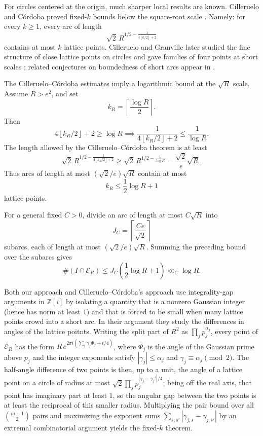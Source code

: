 \documentclass[11pt]{article}
\newcommand{\GI}{\mathbb Z[i]}
\newcommand{\floor}[1]{\left\lfloor #1 \right\rfloor}
\newcommand{\ceil}[1]{\left\lceil #1 \right\rceil}
\newcommand{\E}{\mathcal E}
\begin{document}
For circles centered at the origin, much sharper local results are known.
Cilleruelo and C\'ordoba proved fixed-\(k\) bounds below the square-root scale \cite{CillerueloCordoba1992}.
Namely: for every \(k\ge 1\), every arc of length
\[
  \sqrt2\,R^{1/2-\frac{1}{4\floor{k/2}+2}}
\]
contains at most \(k\) lattice points.
Cilleruelo and Granville later studied the fine structure of close lattice points on circles and gave families of four points at short scales \cite{CillerueloGranville2009}; related conjectures on boundedness of short arcs appear in \cite{CillerueloGranville2007}.

The Cilleruelo--C\'ordoba estimates imply a logarithmic bound at the \(\sqrt R\) scale.
Assume \(R>e^2\), and set
\[
  k_R=\ceil{\frac{\log R}{2}}.
\]
Then
\[
  4\floor{k_R/2}+2\ge \log R
  \implies
  \frac{1}{4\floor{k_R/2}+2}\le \frac1{\log R}.
\]
The length allowed by the Cilleruelo--C\'ordoba theorem is at least
\[
  \sqrt2\,R^{1/2-\frac{1}{4\floor{k_R/2}+2}}
  \ge
  \sqrt2\,R^{1/2-\frac1{\log R}}
  =
  \frac{\sqrt2}{e}\sqrt R.
\]
Thus arcs of length at most \((\sqrt2/e)\sqrt R\) contain at most
\[
  k_R\le \frac12\log R+1
\]
lattice points.

For a general fixed \(C>0\), divide an arc of length at most \(C\sqrt R\) into
\[
  J_C=\ceil{\frac{Ce}{\sqrt2}}
\]
subarcs, each of length at most \((\sqrt2/e)\sqrt R\).
Summing the preceding bound over the subarcs gives
\[
  \#(I\cap\E_R)
  \le
  J_C\left(\frac12\log R+1\right)
  \ll_C
  \log R.
\]

Both our approach and Cilleruelo--C\'ordoba's approach use integrality-gap arguments in \(\GI\) by isolating a quantity that is a nonzero Gaussian integer (hence has norm at least \(1\)) and that is forced to be small when many lattice points crowd into a short arc.
In their argument \cite{CillerueloCordoba1992} they study the differences in angles of the lattice poitnts.
Writing the split part of \(R^2\) as \(\prod_j p_j^{\alpha_j}\), every point of \(\E_R\) has the form \(R\,e^{2\pi i(\sum_j\gamma_j\Phi_j+t/4)}\), where \(\Phi_j\) is the angle of the Gaussian prime above \(p_j\) and the integer exponents satisfy \(|\gamma_j|\le\alpha_j\) and \(\gamma_j\equiv\alpha_j\pmod2\).
The half-angle difference of two points is then, up to a unit, the angle of a lattice point on a circle of radius at most \(\sqrt2\prod_j p_j^{|\gamma_j-\gamma_j'|/4}\); being off the real axis, that point has imaginary part at least \(1\), so the angular gap between the two points is at least the reciprocal of this smaller radius.
Multiplying the pair bound over all \(\binom{m+1}2\) pairs and maximizing the exponent sums \(\sum_{s,s'}|\gamma_{j,s}-\gamma_{j,s'}|\) by an extremal combinatorial argument yields the fixed-\(k\) theorem.
\end{document}
